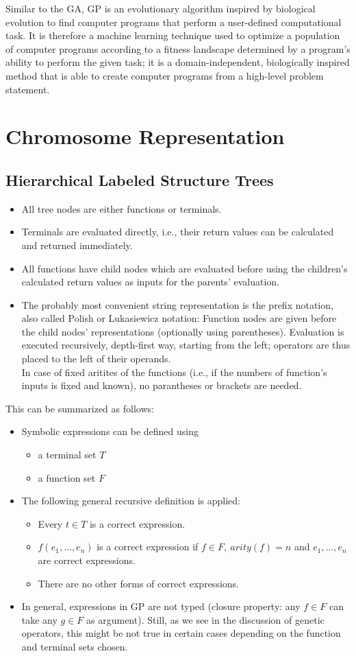 \documentclass[12pt]{book}
\newcounter{subsubsubsection}[subsubsection]
\begin{document}
Similar to the GA, GP is an evolutionary algorithm inspired by biological evolution to find computer programs that perform a user-defined computational task. It is therefore a machine learning technique used to optimize a population of computer programs according to a fitness landscape determined by a program's ability to perform the given task; it is a domain-independent, biologically inspired method that is able to create computer programs from a high-level problem statement.
\section{Chromosome Representation}
\subsection{Hierarchical Labeled Structure Trees}
\begin{itemize}
\item All tree nodes are either functions or terminals.
\item Terminals are evaluated directly, i.e., their return values can be calculated and returned immediately.
\item All functions have child nodes which are evaluated before using the children's calculated return values as inputs for the parents' evaluation.
\item The probably most convenient string representation is the prefix notation, also called Polish or Lukasiewicz notation: Function nodes are given before the child nodes' representations (optionally using parentheses). Evaluation is executed recursively, depth-first way, starting from the left; operators are thus placed to the left of their operands.\\
In case of fixed aritites of the functions (i.e., if the numbers of function's inputs is fixed and known), no parantheses or brackets are needed.
\end{itemize}
This can be summarized as follows:
\begin{itemize}
\item Symbolic expressions can be defined using
\begin{itemize}
\item a terminal set $T$
\item a function set $F$
\end{itemize}
\item The following general recursive definition is applied:
\begin{itemize}
\item Every $t \in T$ is a correct expression.
\item $f(e_1,\dots,e_n)$ is a correct expression if $f \in F,\ arity(f) = n$ and $e_1,\dots,e_n$ are correct expressions.
\item There are no other forms of correct expressions.
\end{itemize}
\item In general, expressions in GP are not typed (closure property: any $f \in F$ can take any $g \in F$ as argument). Still, as we see in the discussion of genetic operators, this might be not true in certain cases depending on the function and terminal sets chosen.
\end{itemize}
\end{document}

